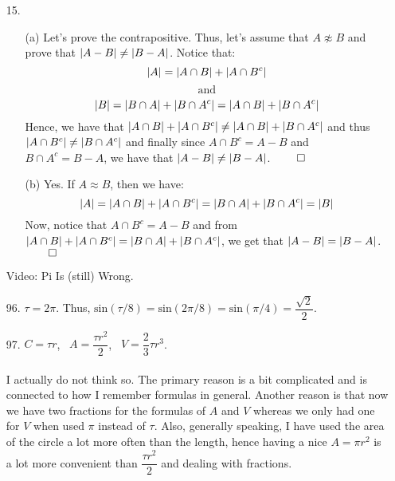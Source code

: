 \documentclass[12pt, a4paper]{article}
\DeclarePairedDelimiter\abs{\lvert}{\rvert}
\begin{document}
\begin{itemize}
\item[15.]
\begin{itemize}
\item[(a)]
Let's prove the contrapositive. Thus, let's assume that $A \not \approx B$ and prove that
$\abs{A - B} \neq \abs{B - A}$. Notice that:
$$\abs{A} = \abs{A \cap B} + \abs{A \cap B^c}$$
$$\mbox{and}$$
$$\abs{B} = \abs{B \cap A}+\abs{B \cap A^c} = \abs{A \cap B}+\abs{B \cap A^c}$$
Hence, we have that $\abs{A \cap B} + \abs{A \cap B^c} \neq \abs{A \cap B}+\abs{B \cap A^c}$
and thus $\abs{A \cap B^c} \neq \abs{B \cap A^c}$ and finally since $A \cap B^c = A - B$ and $B \cap A^c = B - A$,
we have that $\abs{A - B} \neq \abs{B - A}$.
$\qed$
\item[(b)]
Yes. If $A \approx B$, then we have:
$$\abs{A} = \abs{A \cap B} + \abs{A \cap B^c} = \abs{B \cap A}+\abs{B \cap A^c} = \abs{B}$$
Now, notice that $A \cap B^c = A - B$ and from $\abs{A \cap B} + \abs{A \cap B^c} = \abs{B \cap A}+\abs{B \cap A^c}$,
we get that $\abs{A - B} = \abs{B - A}$.
$\qed$
\end{itemize}

\item[]
\item[]

{\Large Video: Pi Is (still) Wrong.}
\item[96.]
$\tau = 2\pi$. Thus, $\mbox{sin}(\tau / 8) = \mbox{sin}(2\pi / 8) = \mbox{sin}(\pi / 4) = \dfrac{\sqrt{2}}{2}$.
\item[97.]
$C = \tau r$, \ $A = \dfrac{\tau r^2}{2}$, \ $V = \dfrac{2}{3}\tau r^3$.\\\\
I actually do not think so. The primary reason is a bit complicated and is connected to how I remember formulas in general.
Another reason is that now we have two fractions for the formulas of $A$ and $V$ whereas we only had one for $V$ when used $\pi$
instead of $\tau$. Also, generally speaking, I have used the area of the circle a lot more often than the length, hence having a nice
$A = \pi r^2$ is a lot more convenient than $\dfrac{\tau r^2}{2}$ and dealing with fractions.
\end{itemize}
\end{document}
